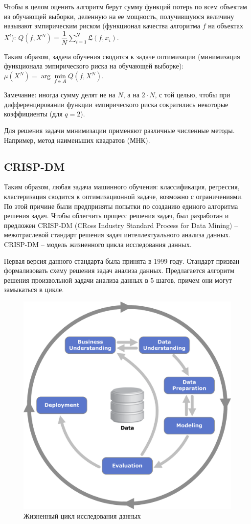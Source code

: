 Чтобы в целом оценить алгоритм берут сумму функций потерь по всем объектам из обучающей выборки, деленную на ее мощность, получившуюся величину называют эмпирическим риском (функционал качества алгоритма $f$ на объектах $X^l$): $Q(f, X^N) = \dfrac{1}{N}\sum\limits_{i=1}^{N}\mathfrak{L}(f,x_i)$.

Таким образом, задача обучения сводится к задаче оптимизации (минимизация функционала эмпирического риска на обучающей выборке): $\mu(X^N) = \arg\min\limits_{f \in A} Q(f,X^N)$.

Замечание: иногда сумму делят не на $N$, а на $2 \cdot N$, с той целью, чтобы при дифференцировании функции эмпирического риска сократились некоторые коэффициенты (для $q=2$).

Для решения задачи минимизации применяют различные численные методы. Например, метод наименьших квадратов (МНК).


\subsection*{CRISP-DM}

Таким образом, любая задача машинного обучения: классификация, регрессия, кластеризация сводится к оптимизационной задаче, возможно с ограничениями. По этой причине были предприняты попытки по созданию единого алгоритма решения задач. Чтобы облегчить процесс решения задач, был разработан и предложен CRISP-DM (CRoss Industry Standard Process for Data Mining) -- межотраслевой стандарт решения задач интеллектуального анализа данных. CRISP-DM -- модель жизненного цикла исследования данных.

Первая версия данного стандарта была принята в 1999 году. Стандарт призван формализовать схему решения задач анализа данных. Предлагается алгоритм решения произвольной задачи анализа данных в 5 шагов, причем они могут замыкаться в цикле.

\begin{figure}[H]
    \begin{center}
        \includegraphics[width=0.6\linewidth]{src/img/CRISP-DM_process_diagram.png}
        \caption{Жизненный цикл исследования данных \cite{wiki:crisp_dm}}
        \label{fig:crisp_dm}
    \end{center}
\end{figure}


